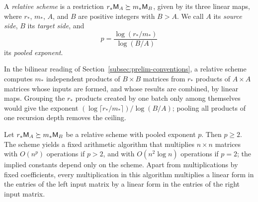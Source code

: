 \begin{definition}\label{def:relative-scheme}
A \emph{relative scheme} is a restriction
\(r_*\mathsf M_A\succeq m_*\mathsf M_B\), given by its three linear maps, where
\(r_*\), \(m_*\), \(A\), and \(B\) are positive integers with \(B>A\). We
call \(A\) its \emph{source side}, \(B\) its \emph{target side}, and
\[
 p=\frac{\log(r_*/m_*)}{\log(B/A)}
\]
its \emph{pooled exponent}.
\end{definition}

In the bilinear reading of Section~\ref{subsec:prelim-conventions}, a
relative scheme computes \(m_*\) independent products of \(B\times B\)
matrices from \(r_*\) products of \(A\times A\) matrices whose inputs are
formed, and whose results are combined, by linear maps. Grouping the
\(r_*\) products created by one batch only among themselves would give the
exponent \((\log\lceil r_*/m_*\rceil)/\log(B/A)\); pooling all products
of one recursion depth removes the ceiling.

\begin{lemma}\label{lem:batch}
Let \(r_*\mathsf M_A\succeq m_*\mathsf M_B\) be a relative scheme with pooled exponent
\(p\). Then \(p\ge2\). The scheme yields a fixed arithmetic algorithm that
multiplies \(n\times n\) matrices with \(O(n^p)\) operations if \(p>2\),
and with \(O(n^2\log n)\) operations if \(p=2\); the implied constants
depend only on the scheme. Apart from multiplications by fixed
coefficients, every multiplication in this algorithm multiplies a linear
form in the entries of the left input matrix by a linear form in the
entries of the right input matrix.
\end{lemma}

